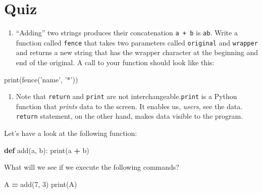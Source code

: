 \documentclass[]{book}
\newenvironment{Shaded}{\begin{snugshade}}{\end{snugshade}}
\newcommand{\BuiltInTok}[1]{#1}
\newcommand{\DecValTok}[1]{\textcolor[rgb]{0.00,0.00,0.81}{#1}}
\newcommand{\KeywordTok}[1]{\textcolor[rgb]{0.13,0.29,0.53}{\textbf{#1}}}
\newcommand{\NormalTok}[1]{#1}
\newcommand{\OperatorTok}[1]{\textcolor[rgb]{0.81,0.36,0.00}{\textbf{#1}}}
\newcommand{\StringTok}[1]{\textcolor[rgb]{0.31,0.60,0.02}{#1}}
\providecommand{\tightlist}{%
  \setlength{\itemsep}{0pt}\setlength{\parskip}{0pt}}
\theoremstyle{definition}
\theoremstyle{definition}
\theoremstyle{definition}
\theoremstyle{remark}
\begin{document}
\hypertarget{quiz-4}{%
\section{Quiz}\label{quiz-4}}

\begin{enumerate}
\def\labelenumi{\arabic{enumi}.}
\tightlist
\item
  ``Adding'' two strings produces their concatenation
  \texttt{\textquotesingle{}a\textquotesingle{}\ +\ \textquotesingle{}b\textquotesingle{}}
  is \texttt{\textquotesingle{}ab\textquotesingle{}}. Write a function
  called \texttt{fence} that takes two parameters called
  \texttt{original} and \texttt{wrapper} and returns a new string that
  has the wrapper character at the beginning and end of the original. A
  call to your function should look like this:
\end{enumerate}

\begin{Shaded}
\begin{Highlighting}[]
\BuiltInTok{print}\NormalTok{(fence(}\StringTok{'name'}\NormalTok{, }\StringTok{'*'}\NormalTok{))}
\end{Highlighting}
\end{Shaded}

\begin{enumerate}
\def\labelenumi{\arabic{enumi}.}
\setcounter{enumi}{1}
\tightlist
\item
  Note that \texttt{return} and \texttt{print} are not
  interchangeable.\texttt{print} is a Python function that \emph{prints}
  data to the screen. It enables us, \emph{users}, see the data.
  \texttt{return} statement, on the other hand, makes data visible to
  the program.
\end{enumerate}

Let's have a look at the following function:

\begin{Shaded}
\begin{Highlighting}[]
\KeywordTok{def}\NormalTok{ add(a, b):}
   \BuiltInTok{print}\NormalTok{(a }\OperatorTok{+}\NormalTok{ b)}
\end{Highlighting}
\end{Shaded}

What will we see if we execute the following commands?

\begin{Shaded}
\begin{Highlighting}[]
\NormalTok{A }\OperatorTok{=}\NormalTok{ add(}\DecValTok{7}\NormalTok{, }\DecValTok{3}\NormalTok{)}
\BuiltInTok{print}\NormalTok{(A)}
\end{Highlighting}
\end{Shaded}
\end{document}
